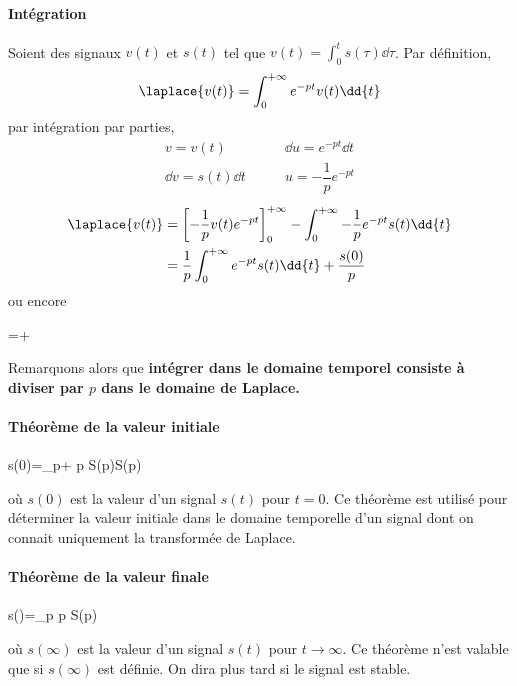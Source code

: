 \paragraph{Intégration}
Soient  des signaux $v(t)$ et $s(t)$ tel que 
$v(t)=\int_{0}^{t}s(\tau)\dd{\tau}$. Par définition,
$$
\laplace{v(t)}=\int_{0}^{+\infty} e^{-pt}v(t)\dd{t}
$$
par intégration par parties,
\begin{align*}
    v=v(t)\qquad&\dd{u}=e^{-pt}\dd{t}\\
    \dd{v}=s(t)\dd{t}\qquad&u=-\dfrac{1}{p}e^{-pt}
\end{align*} 
\begin{align*}
    \laplace{v(t)}&=\left[-\dfrac{1}{p}v(t)e^{-pt}\right]_0^{+\infty}
                          -\int_{0}^{+\infty}
                          -\dfrac{1}{p}e^{-pt}s(t)\dd{t} \\
    &=\dfrac{1}{p}\int_{0}^{+\infty} e^{-pt}s(t)\dd{t}+\dfrac{s(0)}{p}
\end{align*}
ou encore
\begin{bequation}
    =+
\end{bequation}
Remarquons alors que \textbf{intégrer dans le domaine temporel consiste à 
diviser par $p$ dans le domaine de Laplace.}

\paragraph{Théorème de la valeur initiale}
\begin{bequation}
    s(0)=\lim\limits_{p\rightarrow+\infty} p S(p)\qquad \forall S(p)
\end{bequation}
où $s(0)$ est la valeur d'un signal $s(t)$ pour $t=0$.
Ce théorème est utilisé pour déterminer la valeur initiale
dans le domaine temporelle d'un signal dont on connait 
uniquement la transformée de Laplace.

\paragraph{Théorème de la valeur finale}
\begin{bequation}
    s(\infty)=\lim\limits_{p} p S(p)
\end{bequation}
où $s(\infty)$ est la valeur d'un signal $s(t)$ pour $t\to\infty$.
Ce théorème n'est valable que si $s(\infty)$ est définie. On dira plus tard
si le signal est stable.


